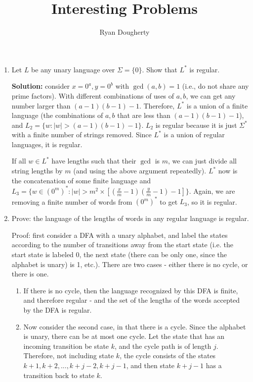 \documentclass[10pt]{article}
\title{Interesting Problems}
\author{Ryan Dougherty}
\date{}
\begin{document}
\maketitle

\begin{enumerate}
\section{Finite Automata}
\item Let $L$ be any unary language over $\Sigma = \{0\}$. Show that $L^*$ is regular.

\par\textbf{Solution:} consider $x = 0^a, y = 0^b$ with $\gcd(a, b) = 1$ (i.e., do not share any prime factors). With different combinations of uses of $a, b$, we can get any number larger than $(a-1)(b-1) - 1$. Therefore, $L^*$ is a union of a finite language (the combinations of $a, b$ that are less than $(a-1)(b-1)-1$), and $L_2 = \{w \colon |w| > (a-1)(b-1)-1\}$. $L_2$ is regular because it is just $\Sigma^*$ with a finite number of strings removed. Since $L^*$ is a union of regular languages, it is regular. 

\par If all $w \in L^*$ have lengths such that their $\gcd$ is $m$, we can just divide all string lengths by $m$ (and using the above argument repeatedly). $L^*$ now is the concatenation of some finite language and $L_3 = \{w \in (0^m)^* \colon |w| > m^2 \times [(\frac{x}{m}-1)(\frac{y}{m}-1) -1]\}$. Again, we are removing a finite number of words from $(0^m)^*$ to get $L_3$, so it is regular. 

\item Prove: the language of the lengths of words in any regular language is regular.

\par Proof: first consider a DFA with a unary alphabet, and label the states according to the number of transitions away from the start state (i.e. the start state is labeled 0, the next state (there can be only one, since the alphabet is unary) is 1, etc.). There are two cases - either there is no cycle, or there is one. 

\begin{enumerate}
\item If there is no cycle, then the language recognized by this DFA is finite, and therefore regular - and the set of the lengths of the words accepted by the DFA is regular.

\item Now consider the second case, in that there is a cycle. Since the alphabet is unary, there can be at most one cycle. Let the state that has an incoming transition be state $k$, and the cycle path is of length $j$. Therefore, not including state $k$, the cycle consists of the states $k+1, k+2, ..., k+j-2, k+j-1$, and then state $k+j-1$ has a transition back to state $k$.


\end{enumerate}
\end{enumerate}
\end{document}
